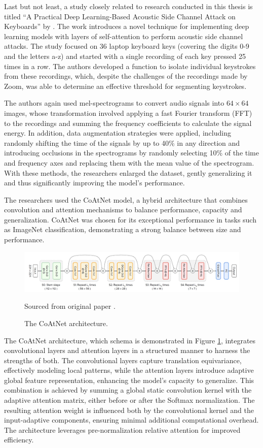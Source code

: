 \documentclass[a4paper,11pt,twoside]{report}
\theoremstyle{definition}
\begin{document}
Last but not least, a study closely related to research conducted in this thesis is titled “A Practical Deep Learning-Based Acoustic Side Channel Attack on Keyboards” by \textit{\cite{coatnet2023}}. The work introduces a novel technique for implementing deep learning models with layers of self-attention to perform acoustic side channel attacks. The study focused on 36 laptop keyboard keys (covering the digits 0-9 and the letters a-z) and started with a single recording of each key pressed 25 times in a row. The authors developed a function to isolate individual keystrokes from these recordings, which, despite the challenges of the recordings made by Zoom, was able to determine an effective threshold for segmenting keystrokes.

The authors again used mel-spectrograms to convert audio signals into $64 \times 64$ images, whose transformation involved applying a fast Fourier transform (FFT) to the recordings and summing the frequency coefficients to calculate the signal energy. In addition, data augmentation strategies were applied, including randomly shifting the time of the signals by up to 40\% in any direction and introducing occlusions in the spectrograms by randomly selecting 10\% of the time and frequency axes and replacing them with the mean value of the spectrogram. With these methods, the researchers enlarged the dataset, gently generalizing it and thus significantly improving the model's performance.

The researchers used the CoAtNet model, a hybrid architecture that combines convolution and attention mechanisms to balance performance, capacity and generalization. CoAtNet was chosen for its exceptional performance in tasks such as ImageNet classification, demonstrating a strong balance between size and performance.

\begin{figure}[h!]
    \centering
    \includegraphics[width=\textwidth]{img_related_work/coatnet.png}
    \caption{The CoAtNet architecture.}
    \footnotesize{Sourced from original paper \cite{coatnet}.}
    \label{fig:coatnet}
\end{figure}

The CoAtNet architecture, which schema is demonstrated in Figure \ref{fig:coatnet}, integrates convolutional layers and attention layers in a structured manner to harness the strengths of both. The convolutional layers capture translation equivariance, effectively modeling local patterns, while the attention layers introduce adaptive global feature representation, enhancing the model's capacity to generalize. This combination is achieved by summing a global static convolution kernel with the adaptive attention matrix, either before or after the Softmax normalization. The resulting attention weight is influenced both by the convolutional kernel and the input-adaptive components, ensuring minimal additional computational overhead. The architecture leverages pre-normalization relative attention for improved efficiency.
\end{document}
